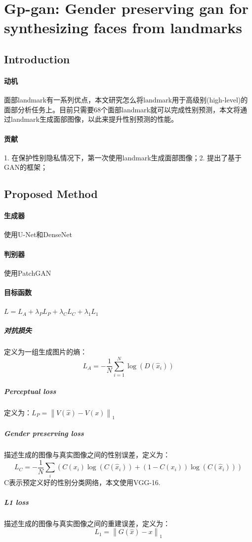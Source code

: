 \documentclass[12pt,a4paper]{article}
\begin{document}
\section{Gp-gan: Gender preserving gan for synthesizing faces from landmarks\cite{gpgan2018}}
\subsection{Introduction}
\paragraph{动机} 面部landmark有一系列优点，本文研究怎么将landmark用于高级别(high-level)的面部分析任务上。目前只需要68个面部landmark就可以完成性别预测，本文将通过landmark生成面部图像，以此来提升性别预测的性能。
\paragraph{贡献} 1. 在保护性别隐私情况下，第一次使用landmark生成面部图像；2. 提出了基于GAN的框架；

\subsection{Proposed Method}
\paragraph{生成器} 使用U-Net和DenseNet
\paragraph{判别器} 使用PatchGAN
\paragraph{目标函数} $L=L_A+\lambda_PL_P+\lambda_CL_C+\lambda_1L_1$
\subparagraph{对抗损失} 定义为一组生成图片的熵：
\begin{equation}
	L_A=-\frac{1}{N}\sum_{i=1}^N\log(D(\hat x_i))
\end{equation}
\subparagraph{Perceptual loss} 定义为：$L_P=\left \| V(\hat x)-V(x) \right \|_1$
\subparagraph{Gender preserving loss} 描述生成的图像与真实图像之间的性别误差，定义为：
\begin{equation}
	L_C=-\frac{1}{N}\sum_i(C(x_i)\log(C(\hat x_i)) +(1-C(x_i))\log(C(\hat x_i)))
\end{equation}
C表示预定义好的性别分类网络，本文使用VGG-16.
\subparagraph{L1 loss} 描述生成的图像与真实图像之间的重建误差，定义为：
\begin{equation}
	L_1= \left \| G(\hat x)-x \right \|_1
\end{equation}
\end{document}
